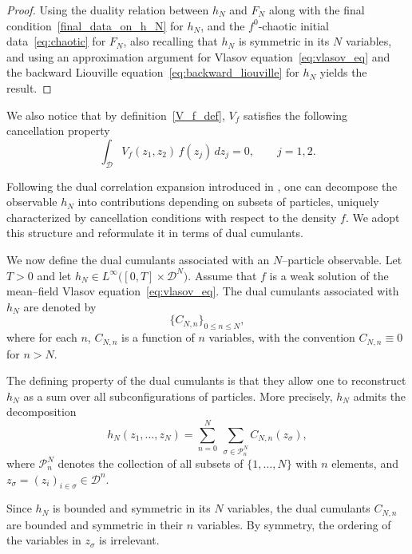\documentclass[pdflatex,sn-mathphys-num]{sn-jnl}
\theoremstyle{thmstyleone}%
\theoremstyle{thmstyletwo}%
\theoremstyle{thmstylethree}%
\begin{document}
\begin{proof}
Using the duality relation between \(h_N\) and \(F_N\) along with the final condition~\eqref{final_data_on_h_N} for \(h_N\), and the \(f^0\)-chaotic initial data~\eqref{eq:chaotic} for \(F_N\), also recalling that $h_N$ is symmetric in its $N$ variables, and using an approximation argument for Vlasov equation~\eqref{eq:vlasov_eq} and the backward Liouville equation~\eqref{eq:backward_liouville} for \(h_N\) yields the result.
\end{proof}

We also notice that by definition~\eqref{V_f_def}, \(V_f\) satisfies the following cancellation property 
\begin{equation}\label{cancellation_prop_V_f}
\int_{\mathcal{D}} V_f(z_1,z_2)\, f(z_j)\, dz_j = 0,
\qquad j=1,2.
\end{equation}

Following the dual correlation expansion introduced in \cite{bresch2024duality}, one can decompose the observable $h_N$ into contributions depending on subsets of particles, uniquely characterized by cancellation conditions with respect to the density $f$. We adopt this structure and reformulate it in terms of dual cumulants.

We now define the dual cumulants associated with an $N$--particle observable. Let $T>0$ and let $h_N \in L^\infty\big([0,T]\times \mathcal D^N\big).$
Assume that $f$ is a weak solution of the mean--field Vlasov equation~\eqref{eq:vlasov_eq}. The dual cumulants associated with $h_N$ are denoted by
\[
\big\{C_{N,n}\big\}_{0\le n\le N},
\]
where for each $n$, $C_{N,n}$ is a function of $n$ variables, with the convention $C_{N,n} \equiv 0$ for $n >N$.

The defining property of the dual cumulants is that they allow one to reconstruct $h_N$ as a sum over all subconfigurations of particles. More precisely, $h_N$ admits the decomposition
\begin{equation}\label{eq:dual_cumulant_expansion}
h_N(z_1,\dots,z_N)
=
\sum_{n=0}^N \ \sum_{\sigma\in\mathcal P_n^N}
C_{N,n}(z_\sigma),
\end{equation}
where $\mathcal P_n^N$ denotes the collection of all subsets of $\{1,\dots,N\}$ with $n$ elements, and $z_\sigma=(z_i)_{i\in\sigma}\in\mathcal D^n$. 

Since $h_N$ is bounded and symmetric in its $N$ variables, the dual cumulants $C_{N,n}$ are bounded and symmetric in their $n$ variables. By symmetry, the ordering of the variables in $z_\sigma$ is irrelevant.
\end{document}
